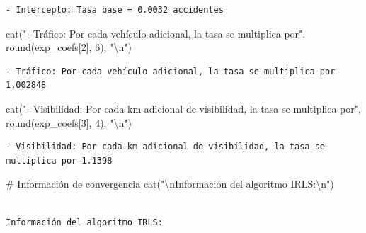 \documentclass[
  letterpaper,
  DIV=11,
  numbers=noendperiod]{scrreprt}
\newenvironment{Shaded}{\begin{snugshade}}{\end{snugshade}}
\newcommand{\CommentTok}[1]{\textcolor[rgb]{0.37,0.37,0.37}{#1}}
\newcommand{\DecValTok}[1]{\textcolor[rgb]{0.68,0.00,0.00}{#1}}
\newcommand{\FunctionTok}[1]{\textcolor[rgb]{0.28,0.35,0.67}{#1}}
\newcommand{\NormalTok}[1]{\textcolor[rgb]{0.00,0.23,0.31}{#1}}
\newcommand{\SpecialCharTok}[1]{\textcolor[rgb]{0.37,0.37,0.37}{#1}}
\newcommand{\StringTok}[1]{\textcolor[rgb]{0.13,0.47,0.30}{#1}}
\begin{document}
\begin{tcolorbox}
\begin{verbatim}
- Intercepto: Tasa base = 0.0032 accidentes
\end{verbatim}

\begin{Shaded}
\begin{Highlighting}[]
\FunctionTok{cat}\NormalTok{(}\StringTok{"{-} Tráfico: Por cada vehículo adicional, la tasa se multiplica por"}\NormalTok{, }\FunctionTok{round}\NormalTok{(exp\_coefs[}\DecValTok{2}\NormalTok{], }\DecValTok{6}\NormalTok{), }\StringTok{"}\SpecialCharTok{\textbackslash{}n}\StringTok{"}\NormalTok{)}
\end{Highlighting}
\end{Shaded}

\begin{verbatim}
- Tráfico: Por cada vehículo adicional, la tasa se multiplica por 1.002848 
\end{verbatim}

\begin{Shaded}
\begin{Highlighting}[]
\FunctionTok{cat}\NormalTok{(}\StringTok{"{-} Visibilidad: Por cada km adicional de visibilidad, la tasa se multiplica por"}\NormalTok{, }\FunctionTok{round}\NormalTok{(exp\_coefs[}\DecValTok{3}\NormalTok{], }\DecValTok{4}\NormalTok{), }\StringTok{"}\SpecialCharTok{\textbackslash{}n}\StringTok{"}\NormalTok{)}
\end{Highlighting}
\end{Shaded}

\begin{verbatim}
- Visibilidad: Por cada km adicional de visibilidad, la tasa se multiplica por 1.1398 
\end{verbatim}

\begin{Shaded}
\begin{Highlighting}[]
\CommentTok{\# Información de convergencia}
\FunctionTok{cat}\NormalTok{(}\StringTok{"}\SpecialCharTok{\textbackslash{}n}\StringTok{Información del algoritmo IRLS:}\SpecialCharTok{\textbackslash{}n}\StringTok{"}\NormalTok{)}
\end{Highlighting}
\end{Shaded}

\begin{verbatim}

Información del algoritmo IRLS:
\end{verbatim}

\begin{Shaded}
\end{Shaded}


\end{tcolorbox}
\end{document}
